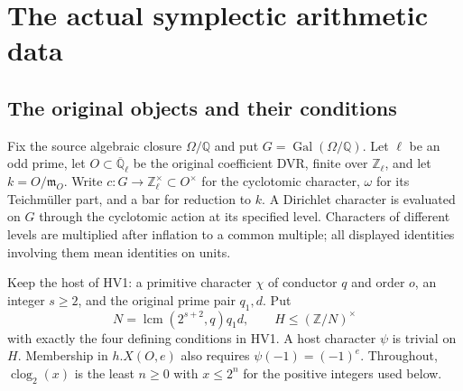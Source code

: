 \section{The actual symplectic arithmetic data}
\label{sec:symplectic-arithmetic-data}


\subsection{The original objects and their conditions}

Fix the source algebraic closure $\Omega/\mathbb Q$ and put
$G=\operatorname{Gal}(\Omega/\mathbb Q)$.  Let $\ell$ be an odd prime,
let $O\subset\overline{\mathbb Q}_\ell$ be the original coefficient
DVR, finite over $\mathbb Z_\ell$, and let $k=O/\mathfrak m_O$.
Write $c:G\to\mathbb Z_\ell^\times\subset O^\times$ for the
cyclotomic character, $\omega$ for its Teichm\"uller part, and a bar
for reduction to $k$.  A Dirichlet character is evaluated on $G$
through the cyclotomic action at its specified level.  Characters of
different levels are multiplied after inflation to a common multiple;
all displayed identities involving them mean identities on units.

Keep the host of HV1: a primitive character $\chi$ of conductor $q$
and order $o$, an integer $s\ge2$, and the original prime pair $q_1,d$.
Put
\[
 N=\operatorname{lcm}(2^{s+2},q)q_1d,
 \qquad H\le(\mathbb Z/N)^\times
 \tag{AX.1}
\]
with exactly the four defining conditions in HV1.  A host character
$\psi$ is trivial on $H$.  Membership in $h.X(O,e)$ also requires
$\psi(-1)=(-1)^e$.  Throughout, $\operatorname{clog}_2(x)$ is the
least $n\ge0$ with $x\le2^n$ for the positive integers used below.

